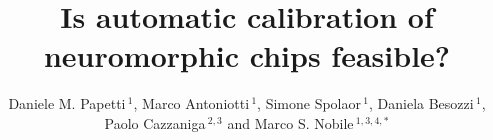 \documentclass[utf8]{frontiersFPHY} %
\def\firstAuthorLast{Papetti {et~al.}} %
\def\Authors{Daniele M. Papetti\,$^{1}$, Marco Antoniotti\,$^{1}$, Simone Spolaor\,$^{1}$, Daniela Besozzi\,$^{1}$,\\Paolo Cazzaniga\,$^{2,3}$ and Marco S. Nobile\,$^{1,3,4,*}$}
\begin{document}
\onecolumn
{}

\title[]{Is automatic calibration of neuromorphic chips feasible?} 

\author[\firstAuthorLast ]{\Authors} %
\address{} %
\correspondance{} %

\extraAuth{}%


\maketitle
\end{document}
